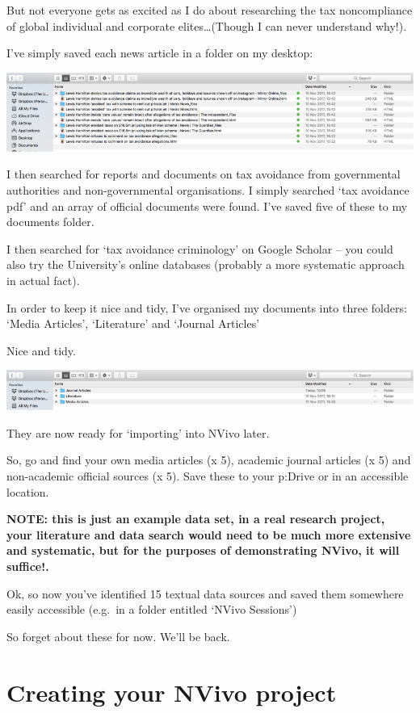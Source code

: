 \documentclass[]{book}
\theoremstyle{definition}
\theoremstyle{definition}
\theoremstyle{definition}
\theoremstyle{remark}
\begin{document}
But not everyone gets as excited as I do about researching the tax
noncompliance of global individual and corporate elites\ldots{}(Though I
can never understand why!).

I've simply saved each news article in a folder on my desktop:

\includegraphics{imgs/qual_03.png}

I then searched for reports and documents on tax avoidance from
governmental authorities and non-governmental organisations. I simply
searched `tax avoidance pdf' and an array of official documents were
found. I've saved five of these to my documents folder.

I then searched for `tax avoidance criminology' on Google Scholar -- you
could also try the University's online databases (probably a more
systematic approach in actual fact).

In order to keep it nice and tidy, I've organised my documents into
three folders: `Media Articles', `Literature' and `Journal Articles'

Nice and tidy.

\includegraphics{imgs/qual_04.png}

They are now ready for `importing' into NVivo later.

So, go and find your own media articles (x 5), academic journal articles
(x 5) and non-academic official sources (x 5). Save these to your
p:Drive or in an accessible location.

\textbf{NOTE: this is just an example data set, in a real research
project, your literature and data search would need to be much more
extensive and systematic, but for the purposes of demonstrating NVivo,
it will suffice!.}

Ok, so now you've identified 15 textual data sources and saved them
somewhere easily accessible (e.g.~in a folder entitled `NVivo Sessions')

So forget about these for now. We'll be back.

\hypertarget{creating-your-nvivo-project}{%
\section{Creating your NVivo
project}\label{creating-your-nvivo-project}}
\end{document}
